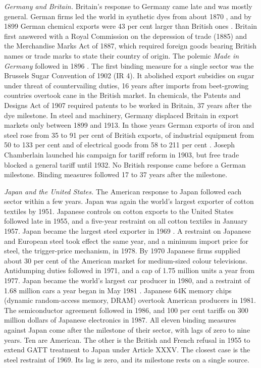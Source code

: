 \documentclass[review,authoryear,12pt]{elsarticle}
\begin{document}
\emph{Germany and Britain.} Britain's response to Germany came late and was mostly general. German firms led the world in synthetic dyes from about 1870 \citep{murmann2001}, and by 1899 German chemical exports were 43 per cent larger than British ones \citep{tyszynski1951}. Britain first answered with a Royal Commission on the depression of trade (1885) and the Merchandise Marks Act of 1887, which required foreign goods bearing British names or trade marks to state their country of origin. The polemic \emph{Made in Germany} followed in 1896 \citep{williams1896}. The first binding measure for a single sector was the Brussels Sugar Convention of 1902 (IR 4). It abolished export subsidies on sugar under threat of countervailing duties, 16 years after imports from beet-growing countries overtook cane in the British market. In chemicals, the Patents and Designs Act of 1907 required patents to be worked in Britain, 37 years after the dye milestone. In steel and machinery, Germany displaced Britain in export markets only between 1899 and 1913. In those years German exports of iron and steel rose from 35 to 91 per cent of British exports, of industrial equipment from 50 to 133 per cent and of electrical goods from 58 to 211 per cent \citep{tyszynski1951}. Joseph Chamberlain launched his campaign for tariff reform in 1903, but free trade blocked a general tariff until 1932. No British response came before a German milestone. Binding measures followed 17 to 37 years after the milestone.

\emph{Japan and the United States.} The American response to Japan followed each sector within a few years. Japan was again the world's largest exporter of cotton textiles by 1951. Japanese controls on cotton exports to the United States followed late in 1955, and a five-year restraint on all cotton textiles in January 1957. Japan became the largest steel exporter in 1969 \citep{ohashi2005}. A restraint on Japanese and European steel took effect the same year, and a minimum import price for steel, the trigger-price mechanism, in 1978. By 1970 Japanese firms supplied about 30 per cent of the American market for medium-sized colour televisions. Antidumping duties followed in 1971, and a cap of 1.75 million units a year from 1977. Japan became the world's largest car producer in 1980, and a restraint of 1.68 million cars a year began in May 1981 \citep{berry1999}. Japanese 64K memory chips (dynamic random-access memory, DRAM) overtook American producers in 1981. The semiconductor agreement followed in 1986, and 100 per cent tariffs on 300 million dollars of Japanese electronics in 1987. All eleven binding measures against Japan come after the milestone of their sector, with lags of zero to nine years. Ten are American. The other is the British and French refusal in 1955 to extend GATT treatment to Japan under Article XXXV. The closest case is the steel restraint of 1969. Its lag is zero, and its milestone rests on a single source.
\end{document}
